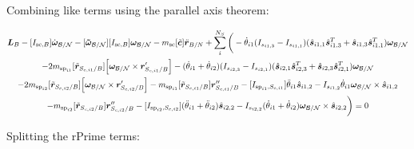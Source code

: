 \documentclass[paper]{aiaaNew}
\begin{document}
Combining like terms using the parallel axis theorem:

\begin{multline}
\bm L_B -[I_{\text{sc},B}] \dot{\bm\omega}_{\cal B/N} -[\bm{\tilde{\omega}}_{\cal B/N}] [I_{\text{sc},B}] \bm\omega_{\cal B/N} 
- m_{\text{sc}} [\tilde{\bm c}] \ddot{\bm r}_{B/N} 
+ \sum\limits_{i}^{N_S}\bigg( -\dot{\theta}_{i1} (I_{s_{i1,3}} - I_{s_{i1,1}})( \hat{\bm s}_{i1,1} \hat{\bm s}_{i1,3}^T + \hat{\bm s}_{i1,3} \hat{\bm s}_{i1,1}^T) \bm \omega_{\cal{B/N}} \\
-2 m_{\text{sp}_{i1}} [\tilde{{\bm r}}_{S_{c,i1}/B}] \Big[\bm\omega_{\cal B/N} \times \bm{r}'_{S_{c,i1}/B}\Big] -(\dot{\theta}_{i1}  + \dot{\theta}_{i2})(I_{s_{i2,3}} - I_{s_{i2,1}}) (\hat{\bm s}_{i2,1} \hat{\bm s}_{i2,3}^T + \hat{\bm s}_{i2,3} \hat{\bm s}_{i2,1}^T) \bm \omega_{\cal{B/N}} 
\\
- 2 m_{\text{sp}_{i2}} [\tilde{{\bm r}}_{S_{c,i2}/B}] \Big[ \bm\omega_{\cal B/N} \times \bm{r}'_{S_{c,i2}/B}\Big]
- m_{\text{sp}_{i1}} [\tilde{{\bm r}}_{S_{c,i1}/B}] \bm{r}''_{S_{c,i1}/B} 
-[I_{\text{sp}_{i1},S_{c,i1}}] \ddot{\theta}_{i1} \hat{\bm s}_{i1,2} 
-I_{s_{i1,2}} \dot{\theta}_{i1} \bm \omega_{\cal{B/N}} \times \hat{\bm s}_{i1,2}
\\- m_{\text{sp}_{i2}} [\tilde{{\bm r}}_{S_{c,i2}/B}] \bm{r}''_{S_{c,i2}/B}
-[I_{\text{sp}_{i2},S_{c,i2}}] (\ddot{\theta}_{i1}  + \ddot{\theta}_{i2})\hat{\bm s}_{i2,2} 
-I_{s_{i2,2}}  (\dot{\theta}_{i1}  + \dot{\theta}_{i2}) \bm \omega_{\cal{B/N}} \times \hat{\bm s}_{i2,2} \bigg) = 0
\end{multline}

Splitting the rPrime terms:
\end{document}
